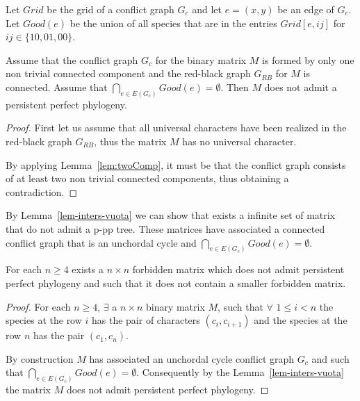Let  $Grid$ be the grid of a conflict graph $G_{c}$ and  let $e=(x,y)$ be an
edge of $G_{c}$.
Let $Good(e)$  be  the union of all species that are in the entries
$Grid[e,ij]$ for $ij \in \{10,01,00\} $.
\begin{lemma}\label{lem-inters-vuota}
  Assume that the conflict  graph  $G_c$   for the binary matrix $M$ is formed
by only one non trivial connected component and the red-black graph $G_{RB}$
for $M$ is connected. Assume that
  $\bigcap_{e \in E(G_c)} Good(e) = \emptyset$.
  Then $M$ does not admit a persistent perfect phylogeny.
\end{lemma}
\begin{proof}
  First let us assume that all universal characters have been realized in the
red-black graph $G_{RB}$, thus the matrix $M$ has no universal character.

  By applying Lemma~\ref{lem:twoComp}, it must be that the conflict graph
consists
  of at least two non trivial connected components, thus obtaining a
contradiction.


\end{proof}



By Lemma~\ref{lem-inters-vuota} we can show that exists a infinite set of
matrix that do not admit a p-pp tree. These matrices have associated a
connected conflict graph that is an unchordal cycle and $\bigcap_{e \in E(G_c)}
Good(e) = \emptyset$.


\begin{theorem}
  \label{teo_esistenza_PM}
  For each $n \ge 4$ exists a $n \times n$ forbidden matrix which does not
admit persistent perfect phylogeny and such
  that it does not contain a smaller forbidden matrix.
\end{theorem}
\begin{proof}
  For each $n\ge 4$, $\exists$ a $n \times n$ binary matrix $M$, such that
$\forall$ $1 \le i < n$ the species at the row $i$ has the pair of characters
$(c_i, c_{i+1})$ and the species at the row $n$ has the pair $(c_1, c_n)$.

  By construction $M$ has associated an unchordal cycle conflict graph $G_c$
and such that $\bigcap_{e \in E(G_c)} Good(e) = \emptyset$. Consequently by the
Lemma~\ref{lem-inters-vuota} the matrix $M$ does not admit persistent perfect
phylogeny.

\end{proof}




